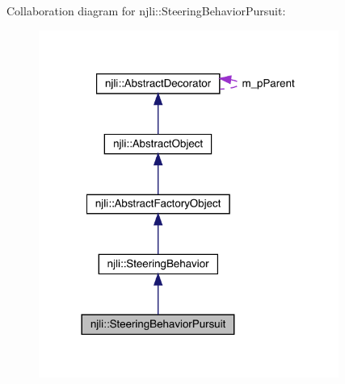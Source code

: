 Collaboration diagram for njli\+:\+:Steering\+Behavior\+Pursuit\+:\nopagebreak
\begin{figure}[H]
\begin{center}
\leavevmode
\includegraphics[width=278pt]{classnjli_1_1_steering_behavior_pursuit__coll__graph}
\end{center}
\end{figure}
